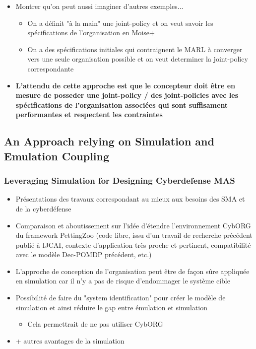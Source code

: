 \begin{itemize}
\begin{itemize}
          \end{itemize}
    \item Montrer qu'on peut aussi imaginer d'autres exemples...
          \begin{itemize}
              \item On a définit "à la main" une joint-policy et on veut savoir les spécifications de l'organisation en Moise+
              \item On a des spécifications initiales qui contraignent le MARL à converger vers une seule organisation possible et on veut determiner la joint-policy correspondante
          \end{itemize}
    \item \textbf{L'attendu de cette approche est que le concepteur doit être en mesure de posseder une joint-policy / des joint-policies avec les spécifications de l'organisation associées qui sont suffisament performantes et respectent les contraintes}
\end{itemize}

\subsection{An Approach relying on Simulation and Emulation Coupling}

\subsubsection{Leveraging Simulation for Designing Cyberdefense MAS}
\begin{itemize}

    \item Présentations des travaux correspondant au mieux aux besoins des SMA et de la cyberdéfense
    \item Comparaison et aboutissement sur l’idée d’étendre l’environnement CybORG du framework PettingZoo (code libre, issu d’un travail de recherche précédent publié à IJCAI, contexte d’application très proche et pertinent, compatibilité avec le modèle Dec-POMDP précédent, etc.)
    \item L'approche de conception de l'organisation peut être de façon sûre appliquée en simulation car il n'y a pas de risque d'endommager le système cible
    \item Possibilité de faire du "system identification" pour créer le modèle de simulation et ainsi réduire le gap entre émulation et simulation
          \begin{itemize}
              \item Cela permettrait de ne pas utiliser CybORG
          \end{itemize}
    \item + autres avantages de la simulation
\end{itemize}

